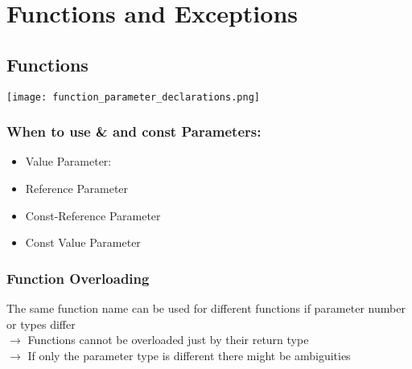 
\section{Functions and Exceptions}

\subsection{Functions}
\begin{center}
    \texttt{[image: function\_parameter\_declarations.png]}
\end{center}

\subsubsection{When to use \& and const Parameters:}
\begin{itemize}
    \item Value Parameter:
    \item Reference Parameter
    \item Const-Reference Parameter
    \item Const Value Parameter
\end{itemize}

\subsubsection{Function Overloading}
The same function name can be used for different functions if parameter number or types differ\\
$\rightarrow$ Functions cannot be overloaded just by their return type\\
$\rightarrow$ If only the parameter type is different there might be ambiguities
